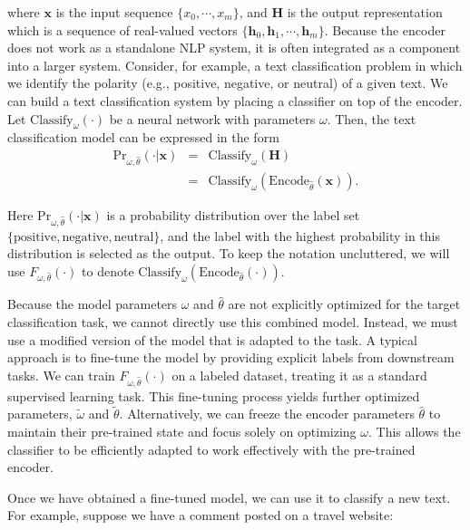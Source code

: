 \noindent where $\mathbf{x}$ is the input sequence $\{x_0, \cdots, x_m\}$, and $\mathbf{H}$ is the output representation which is a sequence of real-valued vectors $\{\mathbf{h}_0,\mathbf{h}_1,\cdots,\mathbf{h}_m\}$. Because the encoder does not work as a standalone NLP system, it is often integrated as a component into a larger system. Consider, for example, a text classification problem in which we identify the polarity (e.g., positive, negative, or neutral) of a given text. We can build a text classification system by placing a classifier on top of the encoder. Let $\mathrm{Classify}_{\omega}(\cdot)$ be a neural network with parameters $\omega$. Then, the text classification model can be expressed in the form
\begin{eqnarray}
\mathrm{Pr}_{\omega,\hat{\theta}}(\cdot|\mathbf{x}) & = & \mathrm{Classify}_{\omega}(\mathbf{H}) \nonumber \\
& = & \mathrm{Classify}_{\omega}(\mathrm{Encode}_{\hat{\theta}}(\mathbf{x})).
\end{eqnarray}

\noindent Here $\mathrm{Pr}_{\omega,\hat{\theta}}(\cdot|\mathbf{x})$ is a probability distribution over the label set $\{\mathrm{positive}, \mathrm{negative}, \mathrm{neutral}\}$, and the label with the highest probability in this distribution is selected as the output. To keep the notation uncluttered, we will use $F_{\omega,\hat{\theta}}(\cdot)$ to denote $\mathrm{Classify}_{\omega}(\mathrm{Encode}_{\hat{\theta}}(\cdot))$.

Because the model parameters $\omega$ and $\hat{\theta}$ are not explicitly optimized for the target classification task, we cannot directly use this combined model. Instead, we must use a modified version of the model that is adapted to the task. A typical approach is to fine-tune the model by providing explicit labels from downstream tasks. We can train $F_{\omega,\hat{\theta}}(\cdot)$ on a labeled dataset, treating it as a standard supervised learning task. This fine-tuning process yields further optimized parameters, $\tilde{\omega}$ and $\tilde{\theta}$. Alternatively, we can freeze the encoder parameters $\hat{\theta}$ to maintain their pre-trained state and focus solely on optimizing $\omega$. This allows the classifier to be efficiently adapted to work effectively with the pre-trained encoder.

Once we have obtained a fine-tuned model, we can use it to classify a new text. For example, suppose we have a comment posted on a travel website:

